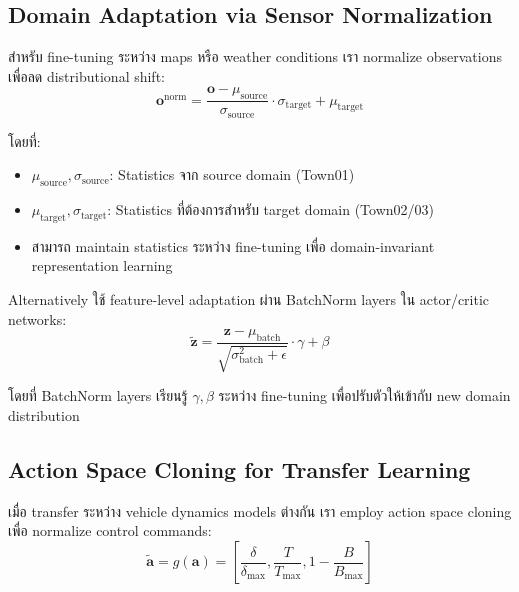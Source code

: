 \documentclass[10pt,a4paper,twocolumn]{article}
\begin{document}
\subsection{Domain Adaptation via Sensor Normalization}

สำหรับ fine-tuning ระหว่าง maps หรือ weather conditions เรา normalize observations เพื่อลด distributional shift:
\begin{equation}\label{eq:domain-adaptation-normalization}
    \mathbf{o}^{\text{norm}} = \frac{\mathbf{o} - \mu_{\text{source}}}{\sigma_{\text{source}}} \cdot \sigma_{\text{target}} + \mu_{\text{target}}
\end{equation}

โดยที่:
\begin{itemize}
    \item $\mu_{\text{source}}, \sigma_{\text{source}}$: Statistics จาก source domain (Town01)
    \item $\mu_{\text{target}}, \sigma_{\text{target}}$: Statistics ที่ต้องการสำหรับ target domain (Town02/03)
    \item สามารถ maintain statistics ระหว่าง fine-tuning เพื่อ domain-invariant representation learning
\end{itemize}

Alternatively ใช้ feature-level adaptation ผ่าน BatchNorm layers ใน actor/critic networks:
\begin{equation}\label{eq:batchnorm-adaptation}
    \tilde{\mathbf{z}} = \frac{\mathbf{z} - \mu_{\text{batch}}}{\sqrt{\sigma^2_{\text{batch}} + \epsilon}} \cdot \gamma + \beta
\end{equation}

โดยที่ BatchNorm layers เรียนรู้ $\gamma, \beta$ ระหว่าง fine-tuning เพื่อปรับตัวให้เข้ากับ new domain distribution

\subsection{Action Space Cloning for Transfer Learning}

เมื่อ transfer ระหว่าง vehicle dynamics models ต่างกัน เรา employ action space cloning เพื่อ normalize control commands:
\begin{equation}\label{eq:action-cloning}
    \tilde{\mathbf{a}} = g(\mathbf{a}) = \left[ \frac{\delta}{\delta_{\max}}, \frac{T}{T_{\max}}, 1 - \frac{B}{B_{\max}} \right]
\end{equation}
\end{document}
